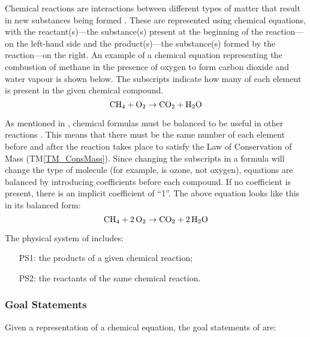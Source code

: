 \documentclass[12pt]{article}
\newcommand{\tmref}[1]{TM\ref{#1}}
\begin{document}
Chemical reactions are interactions between different types of matter that
result in new substances being formed \cite[p. 286]{lund_introduction_2023}.
These are represented using chemical equations, with the reactant(s)---the
substance(s) present at the beginning of the reaction---on the left-hand side
and the product(s)---the substance(s) formed by the reaction---on the right. An
example of a chemical equation representing the combustion of methane in the
presence of oxygen to form carbon dioxide and water vapour is shown below. The
subscripts indicate how many of each element is present in the given chemical
compound.
$$
  \ce{CH4} + \ce{O2} \rightarrow \ce{CO2} + \ce{H2O}
$$

 As mentioned in
, chemical formulas must be balanced to be
useful in other reactions \cite{lund_introduction_2023}. This means that there
must be the same number of each element before and after the reaction takes
place to satisfy the Law of Conservation of Mass (\tmref{TM_ConsMass}). Since
changing the subscripts in a formula will change the type of molecule (for
example,  is ozone, not oxygen), equations are balanced by introducing
coefficients before each compound. If no coefficient is present, there is an
implicit coefficient of ``1''. The above equation looks like this in its
balanced form:
$$
  \ce{CH4} + \ce{2O2} \rightarrow \ce{CO2} + \ce{2H2O}
$$

The physical system of \progname{} includes:

\begin{itemize}

  \item[PS1:] the products of a given chemical reaction;

  \item[PS2:] the reactants of the same chemical reaction.

\end{itemize}


\subsubsection{Goal Statements} \label{sec_goals}
Given a representation of a chemical equation, the goal statements
of \progname{} are:
\end{document}
